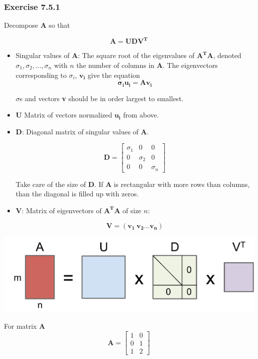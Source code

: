 \subsubsection{Exercise 7.5.1}

Decompose \textbf{A} so that

$$
\mathbf{A = UDV^T}
$$

\begin{itemize}

\item Singular values of \textbf{A}: The square root of the eigenvalues of $\mathbf{A^TA}$, denoted
$\sigma_1, \sigma_2, \dots, \sigma_n$ with $n$ the number of columns in \textbf{A}.
The eigenvectors corresponding to $\sigma_i$, $\mathbf{v_i}$ give the equation
$$
\mathbf{\sigma_i u_i = Av_i}
$$

$\sigma$s and vectors \textbf{v} should be in order largest to smallest.

\item $\mathbf{U}$ Matrix of vectors normalized $\mathbf{u_i}$ from above.

\item $\mathbf{D}$: Diagonal matrix of singular values of \textbf{A}.

$$
\mathbf{D} = \left[\begin{matrix}\sigma_{1} & 0 & 0\\0 & \sigma_{2} & 0\\0 & 0 & \sigma_{n}\end{matrix}\right]
$$

Take care of the size of \textbf{D}. If \textbf{A} is rectangular with more rows than columns, than the diagonal is filled up with zeros.


\item $\mathbf{V}$: Matrix of eigenvectors of $\mathbf{A^TA}$ of size $n$:

$$
\mathbf{V = (v_1\ v_2 \dots v_n)}
$$

\end{itemize}

\includegraphics[width=0.7\linewidth]{figs/SVD_UDV.pdf}

For matrix \textbf{A}
$$
\mathbf{A} = \left[\begin{matrix}1 & 0\\0 & 1\\1 & 2\end{matrix}\right]
$$

